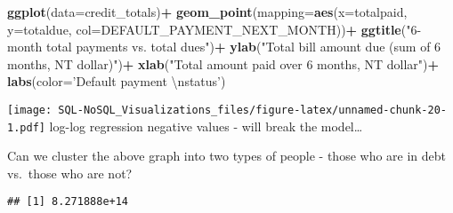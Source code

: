 \documentclass[]{article}
\newenvironment{Shaded}{\begin{snugshade}}{\end{snugshade}}
\newcommand{\KeywordTok}[1]{\textcolor[rgb]{0.13,0.29,0.53}{\textbf{#1}}}
\newcommand{\DataTypeTok}[1]{\textcolor[rgb]{0.13,0.29,0.53}{#1}}
\newcommand{\DecValTok}[1]{\textcolor[rgb]{0.00,0.00,0.81}{#1}}
\newcommand{\CharTok}[1]{\textcolor[rgb]{0.31,0.60,0.02}{#1}}
\newcommand{\StringTok}[1]{\textcolor[rgb]{0.31,0.60,0.02}{#1}}
\newcommand{\CommentTok}[1]{\textcolor[rgb]{0.56,0.35,0.01}{\textit{#1}}}
\newcommand{\OperatorTok}[1]{\textcolor[rgb]{0.81,0.36,0.00}{\textbf{#1}}}
\newcommand{\NormalTok}[1]{#1}
\begin{document}
\begin{Shaded}
\begin{Highlighting}[]
\KeywordTok{ggplot}\NormalTok{(}\DataTypeTok{data=}\NormalTok{credit_totals)}\OperatorTok{+}
\StringTok{  }\KeywordTok{geom_point}\NormalTok{(}\DataTypeTok{mapping=}\KeywordTok{aes}\NormalTok{(}\DataTypeTok{x=}\NormalTok{totalpaid, }\DataTypeTok{y=}\NormalTok{totaldue, }\DataTypeTok{col=}\NormalTok{DEFAULT_PAYMENT_NEXT_MONTH))}\OperatorTok{+}
\StringTok{  }\KeywordTok{ggtitle}\NormalTok{(}\StringTok{"6-month total payments vs. total dues"}\NormalTok{)}\OperatorTok{+}
\StringTok{  }\KeywordTok{ylab}\NormalTok{(}\StringTok{"Total bill amount due (sum of 6 months, NT dollar)"}\NormalTok{)}\OperatorTok{+}
\StringTok{  }\KeywordTok{xlab}\NormalTok{(}\StringTok{"Total amount paid over 6 months, NT dollar"}\NormalTok{)}\OperatorTok{+}
\StringTok{  }\KeywordTok{labs}\NormalTok{(}\DataTypeTok{color=}\StringTok{'Default payment }\CharTok{\textbackslash{}n}\StringTok{status'}\NormalTok{)}
\end{Highlighting}
\end{Shaded}

\texttt{[image: SQL-NoSQL\_Visualizations\_files/figure-latex/unnamed-chunk-20-1.pdf]}
log-log regression negative values - will break the model\ldots{}

Can we cluster the above graph into two types of people - those who are
in debt vs.~those who are not?

\begin{Shaded}
\end{Shaded}

\begin{verbatim}
## [1] 8.271888e+14
\end{verbatim}
\end{document}
